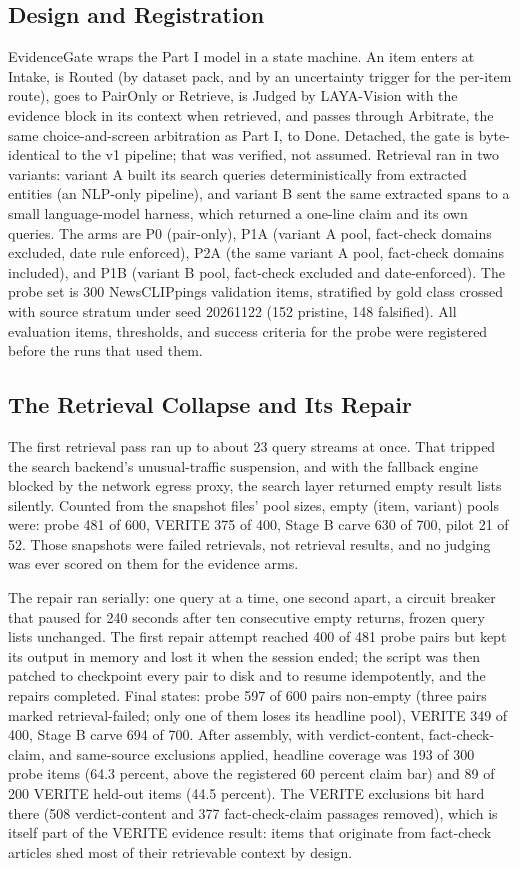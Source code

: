 \documentclass{article} %
\begin{document}
\subsection{Design and Registration}
EvidenceGate wraps the Part I model in a state machine. An item enters at Intake, is Routed (by dataset pack, and by an uncertainty trigger for the per-item route), goes to PairOnly or Retrieve, is Judged by LAYA-Vision with the evidence block in its context when retrieved, and passes through Arbitrate, the same choice-and-screen arbitration as Part I, to Done. Detached, the gate is byte-identical to the v1 pipeline; that was verified, not assumed. Retrieval ran in two variants: variant A built its search queries deterministically from extracted entities (an NLP-only pipeline), and variant B sent the same extracted spans to a small language-model harness, which returned a one-line claim and its own queries. The arms are P0 (pair-only), P1A (variant A pool, fact-check domains excluded, date rule enforced), P2A (the same variant A pool, fact-check domains included), and P1B (variant B pool, fact-check excluded and date-enforced). The probe set is 300 NewsCLIPpings validation items, stratified by gold class crossed with source stratum under seed 20261122 (152 pristine, 148 falsified). All evaluation items, thresholds, and success criteria for the probe were registered before the runs that used them.

\subsection{The Retrieval Collapse and Its Repair}
The first retrieval pass ran up to about 23 query streams at once. That tripped the search backend's unusual-traffic suspension, and with the fallback engine blocked by the network egress proxy, the search layer returned empty result lists silently. Counted from the snapshot files' pool sizes, empty (item, variant) pools were: probe 481 of 600, VERITE 375 of 400, Stage B carve 630 of 700, pilot 21 of 52. Those snapshots were failed retrievals, not retrieval results, and no judging was ever scored on them for the evidence arms.

The repair ran serially: one query at a time, one second apart, a circuit breaker that paused for 240 seconds after ten consecutive empty returns, frozen query lists unchanged. The first repair attempt reached 400 of 481 probe pairs but kept its output in memory and lost it when the session ended; the script was then patched to checkpoint every pair to disk and to resume idempotently, and the repairs completed. Final states: probe 597 of 600 pairs non-empty (three pairs marked retrieval-failed; only one of them loses its headline pool), VERITE 349 of 400, Stage B carve 694 of 700. After assembly, with verdict-content, fact-check-claim, and same-source exclusions applied, headline coverage was 193 of 300 probe items (64.3 percent, above the registered 60 percent claim bar) and 89 of 200 VERITE held-out items (44.5 percent). The VERITE exclusions bit hard there (508 verdict-content and 377 fact-check-claim passages removed), which is itself part of the VERITE evidence result: items that originate from fact-check articles shed most of their retrievable context by design.
\end{document}

